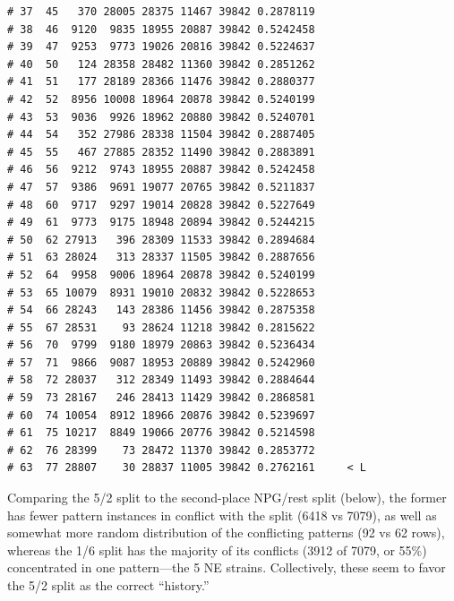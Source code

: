 \documentclass{article}\usepackage[]{graphicx}\usepackage[]{color}
\makeatletter
\newenvironment{kframe}{%
 \def\at@end@of@kframe{}%
 \ifinner\ifhmode%
  \def\at@end@of@kframe{\end{minipage}}%
  \begin{minipage}{\columnwidth}%
 \fi\fi%
 \def\FrameCommand##1{\hskip\@totalleftmargin \hskip-\fboxsep
 \colorbox{shadecolor}{##1}\hskip-\fboxsep
     \hskip-\linewidth \hskip-\@totalleftmargin \hskip\columnwidth}%
 \MakeFramed {\advance\hsize-\width
   \@totalleftmargin\z@ \linewidth\hsize
   \@setminipage}}%
 {\par\unskip\endMakeFramed%
 \at@end@of@kframe}
\newenvironment{knitrout}{}{} %
\makeatother
\begin{document}
\begin{knitrout}
\begin{kframe}
\begin{verbatim}
# 37  45   370 28005 28375 11467 39842 0.2878119        
# 38  46  9120  9835 18955 20887 39842 0.5242458        
# 39  47  9253  9773 19026 20816 39842 0.5224637        
# 40  50   124 28358 28482 11360 39842 0.2851262        
# 41  51   177 28189 28366 11476 39842 0.2880377        
# 42  52  8956 10008 18964 20878 39842 0.5240199        
# 43  53  9036  9926 18962 20880 39842 0.5240701        
# 44  54   352 27986 28338 11504 39842 0.2887405        
# 45  55   467 27885 28352 11490 39842 0.2883891        
# 46  56  9212  9743 18955 20887 39842 0.5242458        
# 47  57  9386  9691 19077 20765 39842 0.5211837        
# 48  60  9717  9297 19014 20828 39842 0.5227649        
# 49  61  9773  9175 18948 20894 39842 0.5244215        
# 50  62 27913   396 28309 11533 39842 0.2894684        
# 51  63 28024   313 28337 11505 39842 0.2887656        
# 52  64  9958  9006 18964 20878 39842 0.5240199        
# 53  65 10079  8931 19010 20832 39842 0.5228653        
# 54  66 28243   143 28386 11456 39842 0.2875358        
# 55  67 28531    93 28624 11218 39842 0.2815622        
# 56  70  9799  9180 18979 20863 39842 0.5236434        
# 57  71  9866  9087 18953 20889 39842 0.5242960        
# 58  72 28037   312 28349 11493 39842 0.2884644        
# 59  73 28167   246 28413 11429 39842 0.2868581        
# 60  74 10054  8912 18966 20876 39842 0.5239697        
# 61  75 10217  8849 19066 20776 39842 0.5214598        
# 62  76 28399    73 28472 11370 39842 0.2853772        
# 63  77 28807    30 28837 11005 39842 0.2762161     < L
\end{verbatim}
\end{kframe}
\end{knitrout}

Comparing the 5/2 split to the second-place NPG/rest split (below), the former has fewer pattern instances in conflict
with the split (6418 vs 7079), as well as somewhat more random distribution of the conflicting patterns (92 vs 62 rows),
whereas the 1/6 split has the majority of its conflicts (3912 of 7079, or 55\%) concentrated in one pattern---the 5 NE
strains.  Collectively, these seem to favor the 5/2 split as the correct ``history.''
\end{document}

